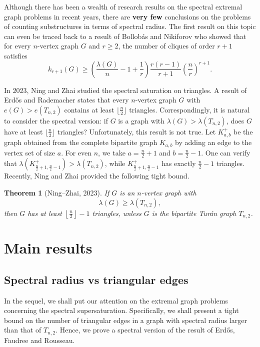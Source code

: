 \documentclass[11pt]{article}
\newtheorem{theorem}{Theorem}[section]
\begin{document}
\medskip 
Although there has been a wealth of research results 
on the spectral extremal graph problems in recent years, 
there are \textbf{very few} conclusions on the problems 
of counting substructures in terms of spectral radius. 
The first result on this topic 
can even be traced back to a 
 result of Bollob\'{a}s 
and Nikiforov \cite{BN2007jctb} who 
showed that for every $n$-vertex graph $G$ and $r\ge 2$, 
the number of cliques of order $r+1$ satisfies 
\[  k_{r+1}(G) \ge 
\left( \frac{\lambda (G)}{n} - 1 + \frac{1}{r} \right) 
\frac{r(r-1)}{r+1} \left( \frac{n}{r}\right)^{r+1}.  \]

In 2023, Ning and Zhai \cite{NZ2021} 
studied the spectral saturation on triangles. 
A result of Erd\H{o}s and Rademacher states that 
every $n$-vertex graph $G$ with $e(G) > e(T_{n,2})$ contains at least 
$\lfloor \frac{n}{2} \rfloor$ triangles.  Correspondingly, 
it is natural to consider the  spectral version:  
if $G$ is a graph  with 
$ \lambda (G)> \lambda (T_{n,2})$, 
does $G$ have at least  $\lfloor \frac{n}{2}\rfloor$ triangles?    
Unfortunately, this result is not true. 
Let $K_{a,b}^+$ be the graph obtained from the complete bipartite graph $K_{a,b}$ by adding an edge to 
the vertex set of size $a$. 
For even $n$, we take $a=\frac{n}{2} +1$ and $b=\frac{n}{2}-1$. 
One can  verify that $\lambda (K_{\frac{n}{2}+1,\frac{n}{2}-1}^+) > \lambda (T_{n,2})$,   while  $K_{\frac{n}{2}+1,\frac{n}{2}-1}^+$ has exactly $\frac{n}{2}-1$ triangles.   
Recently, Ning and Zhai \cite{NZ2021} provided 
the following tight bound. 


\begin{theorem}[Ning--Zhai, 2023] \label{thmNZ2021}
If $G$ is an $n$-vertex graph  with 
\[   \lambda (G) \ge \lambda (T_{n,2}), \]  
then  $G$ has at least 
$ \left\lfloor \frac{n}{2}\right\rfloor -1 $ triangles, 
unless $G$ is the bipartite Tur\'{a}n graph $T_{n,2}$.  
\end{theorem} 





\section{Main results}


\subsection{Spectral radius vs triangular edges}

In the sequel, we shall put our attention on the extremal graph 
 problems 
concerning the spectral supersaturation. 
Specifically, 
we shall present a tight bound  on 
the number of triangular edges 
in a graph with spectral radius larger than that of $T_{n,2}$. Hence, we prove a spectral version of 
the result of Erd\H{o}s, Faudree and Rousseau.  
\end{document}
